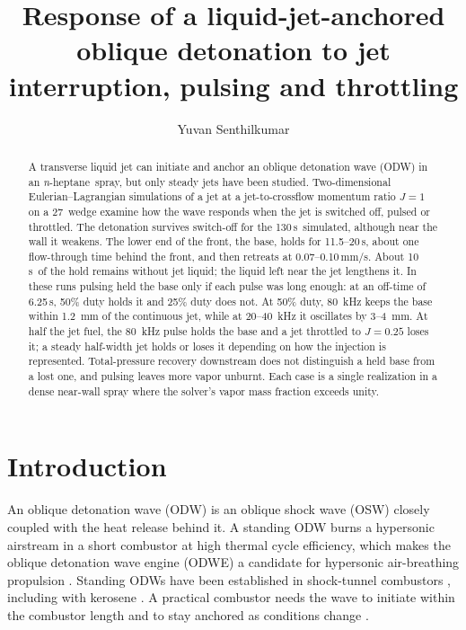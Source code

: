 \documentclass[aip,pof,preprint,amsmath,amssymb]{revtex4-2}
\newcommand{\us}{\,\textmu s}
\newcommand{\mmus}{\,mm/\textmu s}
\newcommand{\nh}{\textit{n}-heptane}
\begin{document}
\title{Response of a liquid-jet-anchored oblique detonation to jet interruption, pulsing and throttling}

\author{Yuvan Senthilkumar}

\begin{abstract}
A transverse liquid jet can initiate and anchor an oblique detonation wave (ODW) in an \nh\ spray, but only steady jets have been studied. Two-dimensional Eulerian--Lagrangian simulations of a jet at a jet-to-crossflow momentum ratio $J = 1$ on a 27\textdegree\ wedge examine how the wave responds when the jet is switched off, pulsed or throttled. The detonation survives switch-off for the 130\us\ simulated, although near the wall it weakens. The lower end of the front, the base, holds for 11.5--20\us, about one flow-through time behind the front, and then retreats at 0.07--0.10\mmus. About 10\us\ of the hold remains without jet liquid; the liquid left near the jet lengthens it. In these runs pulsing held the base only if each pulse was long enough: at an off-time of 6.25\us, 50\% duty holds it and 25\% duty does not. At 50\% duty, 80~kHz keeps the base within 1.2~mm of the continuous jet, while at 20--40~kHz it oscillates by 3--4~mm. At half the jet fuel, the 80~kHz pulse holds the base and a jet throttled to $J = 0.25$ loses it; a steady half-width jet holds or loses it depending on how the injection is represented. Total-pressure recovery downstream does not distinguish a held base from a lost one, and pulsing leaves more vapor unburnt. Each case is a single realization in a dense near-wall spray where the solver's vapor mass fraction exceeds unity.
\end{abstract}

\maketitle

\section{Introduction}

An oblique detonation wave (ODW) is an oblique shock wave (OSW) closely coupled with the heat release behind it. A standing ODW burns a hypersonic airstream in a short combustor at high thermal cycle efficiency, which makes the oblique detonation wave engine (ODWE) a candidate for hypersonic air-breathing propulsion \cite{Kailasanath2000,Jiang2023review,Rosato2021}. Standing ODWs have been established in shock-tunnel combustors \cite{Zhang2022exp}, including with kerosene \cite{Han2023trip}. A practical combustor needs the wave to initiate within the combustor length and to stay anchored as conditions change \cite{Jiang2023review,ZhangWen2025}.
\end{document}
